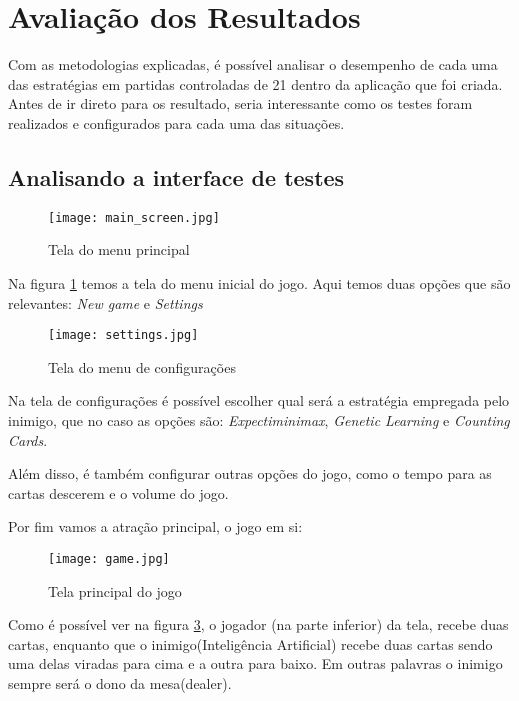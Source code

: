 \section{Avaliação dos Resultados}

Com as metodologias explicadas, é possível analisar o desempenho de cada uma das 
estratégias em partidas controladas de 21 dentro da aplicação que foi criada. Antes 
de ir direto para os resultado, seria interessante como os testes foram realizados 
e configurados para cada uma das situações.

\newpage

\subsection{Analisando a interface de testes}

\begin{figure}[ht] 
    \centering
    \texttt{[image: main\_screen.jpg]}
    \caption{Tela do menu principal}
    \label{fig:main_menu}
\end{figure}

Na figura \ref{fig:main_menu} temos a tela do menu inicial do jogo. Aqui temos 
duas opções que são relevantes: \emph{New game} e \emph{Settings}

\begin{figure}[ht] 
    \centering
    \texttt{[image: settings.jpg]}
    \caption{Tela do menu de configurações}
    \label{fig:settings}
\end{figure}

Na tela de configurações é possível escolher qual será a estratégia 
empregada pelo inimigo, que no caso as opções são: \emph{Expectiminimax}, 
\emph{Genetic Learning} e \emph{Counting Cards}.

Além disso, é também configurar outras opções do jogo, como o tempo para 
as cartas descerem e o volume do jogo.

Por fim vamos a atração principal, o jogo em si:

\begin{figure}[ht] 
    \centering
    \texttt{[image: game.jpg]}
    \caption{Tela principal do jogo}
    \label{fig:game}
\end{figure}

Como é possível ver na figura \ref{fig:game}, o jogador (na parte inferior)
da tela, recebe duas cartas, enquanto que o inimigo(Inteligência Artificial)
recebe duas cartas sendo uma delas viradas para cima e a outra para baixo. Em 
outras palavras o inimigo sempre será o dono da mesa(dealer).

